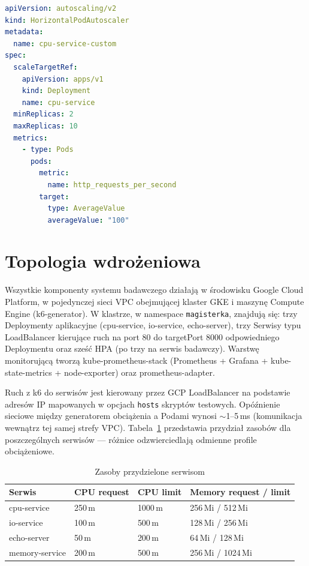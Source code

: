 \begin{lstlisting}[language=yaml, caption={Przykładowa konfiguracja HPA Custom RPS}, label={lst:hpa-custom-config}]
apiVersion: autoscaling/v2
kind: HorizontalPodAutoscaler
metadata:
  name: cpu-service-custom
spec:
  scaleTargetRef:
    apiVersion: apps/v1
    kind: Deployment
    name: cpu-service
  minReplicas: 2
  maxReplicas: 10
  metrics:
    - type: Pods
      pods:
        metric:
          name: http_requests_per_second
        target:
          type: AverageValue
          averageValue: "100"
\end{lstlisting}

\section{Topologia wdrożeniowa}

Wszystkie komponenty systemu badawczego działają w środowisku Google Cloud Platform, w pojedynczej sieci VPC obejmującej klaster GKE i maszynę Compute Engine (k6-generator). W klastrze, w namespace \texttt{magisterka}, znajdują się: trzy Deploymenty aplikacyjne (cpu-service, io-service, echo-server), trzy Serwisy typu LoadBalancer kierujące ruch na port 80 do targetPort 8000 odpowiedniego Deploymentu oraz sześć HPA (po trzy na serwis badawczy). Warstwę monitorującą tworzą kube-prometheus-stack (Prometheus + Grafana + kube-state-metrics + node-exporter) oraz prometheus-adapter.

Ruch z k6 do serwisów jest kierowany przez GCP LoadBalancer na podstawie adresów IP mapowanych w opcjach \texttt{hosts} skryptów testowych. Opóźnienie sieciowe między generatorem obciążenia a Podami wynosi $\sim$1--5\,ms (komunikacja wewnątrz tej samej strefy VPC). Tabela~\ref{tab:resource-allocation} przedstawia przydział zasobów dla poszczególnych serwisów --- różnice odzwierciedlają odmienne profile obciążeniowe.

\begin{table}[H]
  \centering
  \begin{tabularx}{\textwidth}{|l|X|X|X|}
    \hline
    \textbf{Serwis} & \textbf{CPU request} & \textbf{CPU limit} & \textbf{Memory request / limit} \\
    \hline
    cpu-service & 250\,m & 1000\,m & 256\,Mi / 512\,Mi \\
    io-service & 100\,m & 500\,m & 128\,Mi / 256\,Mi \\
    echo-server & 50\,m & 200\,m & 64\,Mi / 128\,Mi \\
    memory-service & 200\,m & 500\,m & 256\,Mi / 1024\,Mi \\
    \hline
  \end{tabularx}
  \caption{Zasoby przydzielone serwisom}
  \label{tab:resource-allocation}
\end{table}

